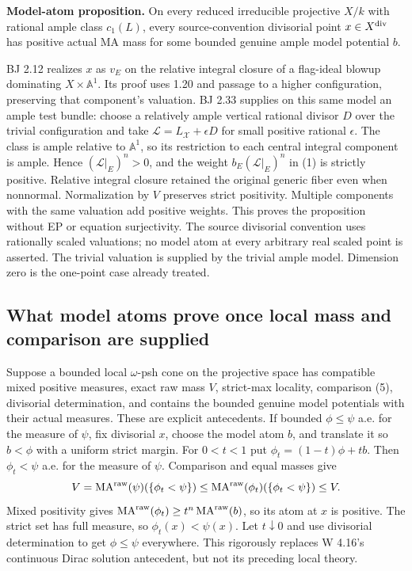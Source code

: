 \documentclass[
  11pt,
]{article}
\providecommand{\MA}{\operatorname{MA}}
\begin{document}
\textbf{Model-atom proposition.} On every reduced irreducible projective
\(X/k\) with rational ample class \(c_1(L)\), every source-convention
divisorial point \(x\in X^{\rm div}\) has positive actual MA mass for
some bounded genuine ample model potential \(b\).

BJ 2.12 realizes \(x\) as \(v_E\) on the relative integral closure of a
flag-ideal blowup dominating \(X\times\mathbb A^1\). Its proof uses 1.20
and passage to a higher configuration, preserving that component's
valuation. BJ 2.33 supplies on this same model an ample test bundle:
choose a relatively ample vertical rational divisor \(D\) over the
trivial configuration and take \(\mathcal L=L_{\mathcal X}+\epsilon D\)
for small positive rational \(\epsilon\). The class is ample relative to
\(\mathbb A^1\), so its restriction to each central integral component
is ample. Hence \((\mathcal L|_E)^n>0\), and the weight
\(b_E(\mathcal L|_E)^n\) in (1) is strictly positive. Relative integral
closure retained the original generic fiber even when nonnormal.
Normalization by \(V\) preserves strict positivity. Multiple components
with the same valuation add positive weights. This proves the
proposition without EP or equation surjectivity. The source divisorial
convention uses rationally scaled valuations; no model atom at every
arbitrary real scaled point is asserted. The trivial valuation is
supplied by the trivial ample model. Dimension zero is the one-point
case already treated.

\subsection{What model atoms prove once local mass and comparison are
supplied}\label{what-model-atoms-prove-once-local-mass-and-comparison-are-supplied}

Suppose a bounded local \(\omega\)-psh cone on the projective space has
compatible mixed positive measures, exact raw mass \(V\), strict-max
locality, comparison (5), divisorial determination, and contains the
bounded genuine model potentials with their actual measures. These are
explicit antecedents. If bounded \(\phi\le\psi\) a.e. for the measure of
\(\psi\), fix divisorial \(x\), choose the model atom \(b\), and
translate it so \(b<\phi\) with a uniform strict margin. For \(0<t<1\)
put \(\phi_t=(1-t)\phi+tb\). Then \(\phi_t<\psi\) a.e. for the measure
of \(\psi\). Comparison and equal masses give
\[V=\MA^{\rm raw}(\psi)(\{\phi_t<\psi\})
   \le\MA^{\rm raw}(\phi_t)(\{\phi_t<\psi\})\le V.\] Mixed positivity
gives \(\MA^{\rm raw}(\phi_t)\ge t^n\MA^{\rm raw}(b)\), so its atom at
\(x\) is positive. The strict set has full measure, so
\(\phi_t(x)<\psi(x)\). Let \(t\downarrow0\) and use divisorial
determination to get \(\phi\le\psi\) everywhere. This rigorously
replaces W 4.16's continuous Dirac solution antecedent, but not its
preceding local theory.
\end{document}
